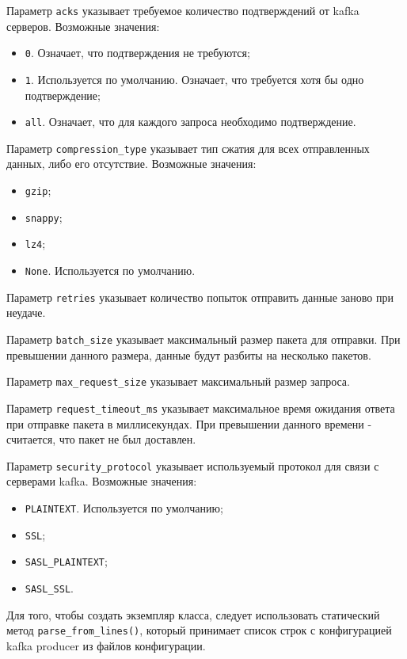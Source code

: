 Параметр \texttt{acks} указывает требуемое количество подтверждений от kafka серверов.
Возможные значения:
\begin{itemize}
    \item \texttt{0}. Означает, что подтверждения не требуются;
    \item \texttt{1}. Используется по умолчанию. Означает, что требуется хотя бы одно подтверждение;
    \item \texttt{all}. Означает, что для каждого запроса необходимо подтверждение.
\end{itemize}

Параметр \texttt{compression\_type} указывает тип сжатия для всех отправленных данных, либо его отсутствие.
Возможные значения:
\begin{itemize}
    \item \texttt{gzip};
    \item \texttt{snappy};
    \item \texttt{lz4};
    \item \texttt{None}. Используется по умолчанию.
\end{itemize}

Параметр \texttt{retries} указывает количество попыток отправить данные заново при неудаче.

Параметр \texttt{batch\_size} указывает максимальный размер пакета для отправки.
При превышении данного размера, данные будут разбиты на несколько пакетов.

Параметр \texttt{max\_request\_size} указывает максимальный размер запроса.

Параметр \texttt{request\_timeout\_ms} указывает максимальное время ожидания ответа при отправке пакета в миллисекундах.
При превышении данного времени - считается, что пакет не был доставлен.

Параметр \texttt{security\_protocol} указывает используемый протокол для связи с серверами kafka.
Возможные значения:
\begin{itemize}
    \item \texttt{PLAINTEXT}. Используется по умолчанию;
    \item \texttt{SSL};
    \item \texttt{SASL\_PLAINTEXT};
    \item \texttt{SASL\_SSL}.
\end{itemize}

Для того, чтобы создать экземпляр класса, следует использовать статический метод \texttt{parse\_from\_lines()}, который принимает список строк с конфигурацией kafka producer из файлов конфигурации.

